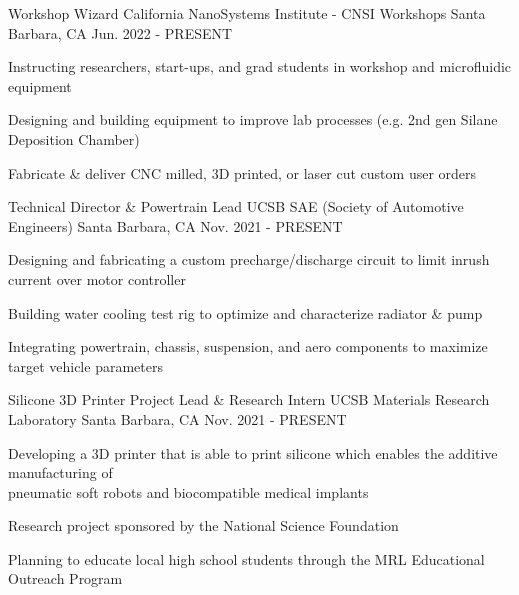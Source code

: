 

\begin{cventries}

\cventry
{Workshop Wizard} %
{California NanoSystems Institute - CNSI Workshops} %
{Santa Barbara, CA} %
{Jun. 2022 - PRESENT} %
{ %
\begin{cvitems}
\item {Instructing researchers, start-ups, and grad students in workshop and microfluidic equipment}
\item {Designing and building equipment to improve lab processes (e.g. 2nd gen Silane Deposition Chamber)}
\item {Fabricate \& deliver CNC milled, 3D printed, or laser cut custom user orders }
\end{cvitems}
}


\cventry
{Technical Director \& Powertrain Lead} %
{UCSB SAE (Society of Automotive Engineers)} %
{Santa Barbara, CA} %
{Nov. 2021 - PRESENT} %
{ %
\begin{cvitems}   
\item {Designing and fabricating a custom precharge/discharge circuit to limit inrush current over motor controller}
\item {Building water cooling test rig to optimize and characterize radiator \& pump}
\item {Integrating powertrain, chassis, suspension, and aero components to maximize target vehicle parameters}
\end{cvitems}
}



\cventry
{Silicone 3D Printer Project Lead \& Research Intern} %
{UCSB Materials Research Laboratory} %
{Santa Barbara, CA} %
{Nov. 2021 - PRESENT} %
{ %
\begin{cvitems}
\item {Developing a 3D printer that is able to print silicone which enables the additive manufacturing of \\ pneumatic soft robots and biocompatible medical implants}
\item {Research project sponsored by the National Science Foundation}
\item {Planning to educate local high school students through the MRL Educational Outreach Program}
\end{cvitems}
}


\end{cventries}
